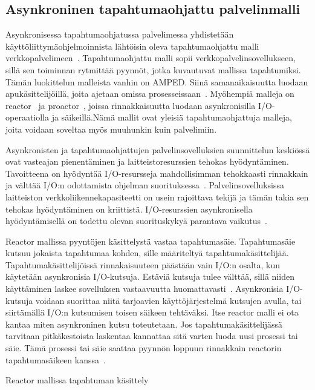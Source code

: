 \documentclass[12pt]{article}
\begin{document}
\subsection{Asynkroninen tapahtumaohjattu palvelinmalli}

Asynkronisessa tapahtumaohjatussa palvelimessa yhdistetään
käyttöliittymäohjelmoinnista lähtöisin oleva tapahtumaohjattu malli
verkkopalvelimeen~\cite{pai_flash:_1999}. Tapahtumaohjattu malli sopii verkkopalvelinsovellukseen,
sillä sen toiminnan rytmittää pyynnöt, jotka
kuvautuvat mallissa tapahtumiksi.
Tämän luokittelun malleista vanhin on AMPED. Siinä
samanaikaisuutta luodaan apukäsittelijöillä, joita
ajetaan omissa prosesseissaan~\cite{pai_flash:_1999}.
Myöhempiä malleja on reactor~\cite{schmidt_reactor:_1995}
ja proactor~\cite{hu_applying_1998}, joissa
rinnakkaisuutta luodaan asynkronisilla I/O-operaatiolla
ja säikeillä.Nämä mallit ovat yleisiä tapahtumaohjattuja malleja,
joita voidaan soveltaa myös muuhunkin kuin palvelimiin.

Asynkronisten ja tapahtumaohjattujen palvelinsovelluksien suunnittelun keskiössä
ovat vasteajan pienentäminen ja laitteistoresurssien tehokas hyödyntäminen.
Tavoitteena on hyödyntää I/O-resursseja mahdollisimman tehokkaasti
rinnakkain ja välttää I/O:n odottamista ohjelman suorituksessa~\cite{pai_flash:_1999}.
Palvelinsovelluksissa
laitteiston verkkoliikennekapasiteetti on usein rajoittava tekijä ja tämän takia
sen tehokas hyödyntäminen on kriittistä. I/O-resurssien asynkronisella hyödyntämisellä on todettu
olevan suorituskykyä parantava vaikutus~\cite{hu_applying_1998}.

Reactor mallissa pyyntöjen käsittelystä
vastaa tapahtumasäie.
Tapahtumasäie kutsuu jokaista tapahtumaa kohden, sille
määriteltyä tapahtumakäsittelijää.
Tapahtumakäsittelijöissä rinnakaisuuteen päästään
vain I/O:n osalta, kun käytetään asynkronisia
I/O-kutsuja.
Estäviä kutsuja tulee välttää,
sillä niiden käyttäminen laskee sovelluksen
vastaavuutta huomattavasti~\cite{schmidt_reactor:_1995}.
Asynkronisia I/O-kutsuja 
voidaan suorittaa niitä tarjoavien käyttöjärjestelmä kutsujen
avulla, tai siirtämällä I/O:n kutsumisen toisen säikeen tehtäväksi.
Itse reactor malli ei ota kantaa miten asynkroninen kutsu toteutetaan.
Jos tapahtumakäsittelijässä tarvitaan pitkäkestoista laskentaa
kannattaa sitä varten luoda uusi prosessi tai säie. Tämä
prosessi tai säie saattaa pyynnön loppuun rinnakkain 
reactorin tapahtumasäikeen kanssa~\cite{schmidt_reactor:_1995}.

Reactor mallissa tapahtuman käsittely
\end{document}
